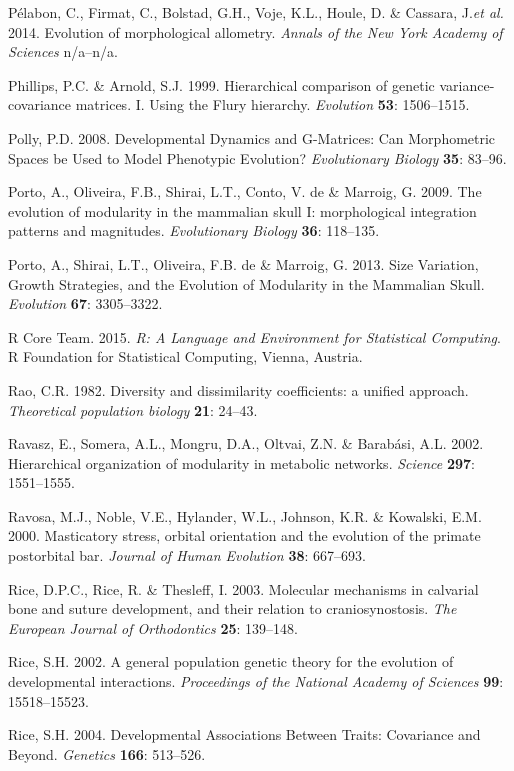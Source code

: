 \documentclass[12pt,twoside]{report}
\begin{document}
Pélabon, C., Firmat, C., Bolstad, G.H., Voje, K.L., Houle, D. \&
Cassara, J.\emph{et al.} 2014. Evolution of morphological allometry.
\emph{Annals of the New York Academy of Sciences} n/a--n/a.

Phillips, P.C. \& Arnold, S.J. 1999. Hierarchical comparison of genetic
variance-covariance matrices. I. Using the Flury hierarchy.
\emph{Evolution} \textbf{53}: 1506--1515.

Polly, P.D. 2008. Developmental Dynamics and G-Matrices: Can
Morphometric Spaces be Used to Model Phenotypic Evolution?
\emph{Evolutionary Biology} \textbf{35}: 83--96.

Porto, A., Oliveira, F.B., Shirai, L.T., Conto, V. de \& Marroig, G.
2009. The evolution of modularity in the mammalian skull I:
morphological integration patterns and magnitudes. \emph{Evolutionary
Biology} \textbf{36}: 118--135.

Porto, A., Shirai, L.T., Oliveira, F.B. de \& Marroig, G. 2013. Size
Variation, Growth Strategies, and the Evolution of Modularity in the
Mammalian Skull. \emph{Evolution} \textbf{67}: 3305--3322.

R Core Team. 2015. \emph{R: A Language and Environment for Statistical
Computing}. R Foundation for Statistical Computing, Vienna, Austria.

Rao, C.R. 1982. Diversity and dissimilarity coefficients: a unified
approach. \emph{Theoretical population biology} \textbf{21}: 24--43.

Ravasz, E., Somera, A.L., Mongru, D.A., Oltvai, Z.N. \& Barabási, A.L.
2002. Hierarchical organization of modularity in metabolic networks.
\emph{Science} \textbf{297}: 1551--1555.

Ravosa, M.J., Noble, V.E., Hylander, W.L., Johnson, K.R. \& Kowalski,
E.M. 2000. Masticatory stress, orbital orientation and the evolution of
the primate postorbital bar. \emph{Journal of Human Evolution}
\textbf{38}: 667--693.

Rice, D.P.C., Rice, R. \& Thesleff, I. 2003. Molecular mechanisms in
calvarial bone and suture development, and their relation to
craniosynostosis. \emph{The European Journal of Orthodontics}
\textbf{25}: 139--148.

Rice, S.H. 2002. A general population genetic theory for the evolution
of developmental interactions. \emph{Proceedings of the National Academy
of Sciences} \textbf{99}: 15518--15523.

Rice, S.H. 2004. Developmental Associations Between Traits: Covariance
and Beyond. \emph{Genetics} \textbf{166}: 513--526.
\end{document}
